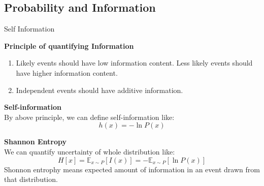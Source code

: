 \documentclass{bredelebeamer}
\begin{document}
\subsection{Probability and Information}
\begin{frame}{Self Information}
  \begin{justify}
    \textbf{Principle of quantifying Information} \\

    \begin{enumerate}
      \item Likely events should have low information content. Less likely events
            should have higher information content.
      \item Independent events should have additive information.
    \end{enumerate}

    \textbf{Self-information} \\
    By above principle, we can define self-information like:
    \begin{equation}
      h(x) = - \ln P(x)
    \end{equation}

    \textbf{Shannon Entropy} \\
    We can quantify uncertainty of whole distribution like:
    \begin{equation}
      H[x] = \mathbb{E}_{x \sim P} [I(x)] = -\mathbb{E}_{x \sim P} [\ln P(x)]
    \end{equation}
    Shonnon entrophy means expected amount of information in an event drawn
    from that distribution.

  \end{justify}
\end{frame}

\end{document}
